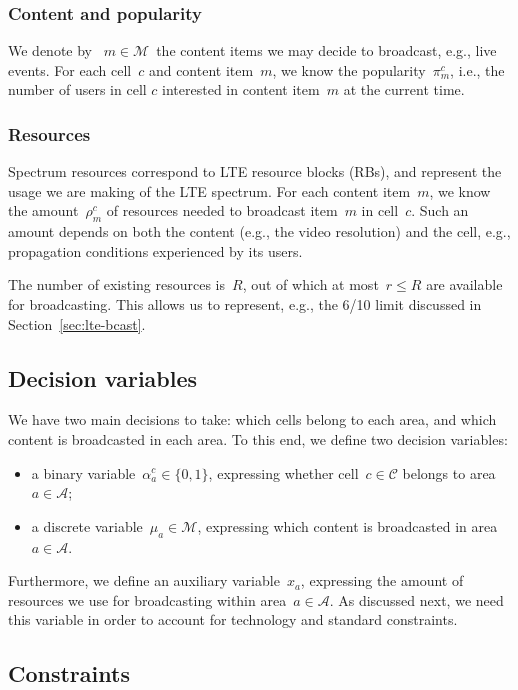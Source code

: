 \documentclass[10pt, conference, compsocconf]{IEEEtran}
\newcommand{\Cc}{\mathcal{C}}
\newcommand{\Ac}{\mathcal{A}}
\newcommand{\Mc}{\mathcal{M}}
\numberwithin{equation}{section}
\begin{document}
\subsubsection{Content and popularity}

We denote by ~$m\in\Mc$\ the content items we may decide to broadcast, e.g., live events.
For each cell~$c$ and content item~$m$, we know the popularity~$\pi^c_m$, i.e., the number of users
in cell $c$ interested in content item~$m$ at the current time.

\subsubsection{Resources}

Spectrum resources correspond to LTE resource blocks (RBs), and represent the usage we are making
of the LTE spectrum.
For each content item~$m$, we know the amount~$\rho^c_m$ of resources needed to 
broadcast item~$m$
in cell~$c$. Such an amount depends on both the content (e.g., the
video resolution) and the cell, e.g., propagation conditions
experienced by its users.

The number of existing resources is~$R$, out of which at most~$r\leq R$ are available for broadcasting.
This allows us to represent, e.g., the 6/10 limit discussed in Section~\ref{sec:lte-bcast}.

\subsection{Decision variables}

We have two main decisions to take: which cells belong to each area, and which content is broadcasted
in each area. To this end, we define two decision variables:
\begin{itemize}
\item a binary variable~$\alpha_a^c\in\{0,1\}$, expressing whether cell~$c\in\Cc$ belongs to area~$a\in\Ac$;
\item a discrete variable~$\mu_a\in\Mc$, expressing which content is broadcasted in area~$a\in\Ac$.
\end{itemize}

Furthermore, we define an auxiliary variable~$x_a$, expressing the amount of resources we use for
broadcasting within area~$a\in\Ac$. As discussed next, we need this variable in order to account for
technology and standard constraints.

\subsection{Constraints}
\end{document}
